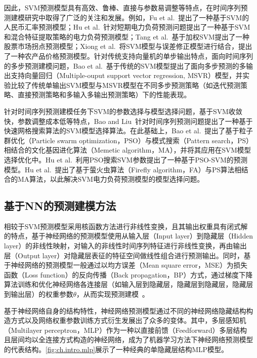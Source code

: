 因此，SVM预测模型具有高效、鲁棒、直接与参数易调整等特点，在时间序列预测建模研究中取得了广泛的关注和发展。例如，Fu et al.~\cite{fuEvolutionary2019}提出了一种基于SVM的人民币汇率预测模型；Hu et al.~\cite{huHybrid2015}针对短期电力负荷预测问题提出了一种基于SVM和混合特征提取策略的电力负荷预测模型；Tang et al.~\cite{tangNew2019}基于加权SVM提出了一种股票市场拐点预测模型；Xiong et al.~\cite{xiongCombination2015}将SVM模型与误差修正模型进行结合，提出了一种农产品价格预测模型。针对传统支持向量机的单步输出特点，面向时间序列的多步预测建模问题，Bao et al.~\cite{baoMultistepahead2014}基于传统的SVM模型提出了面向多步预测的多输出支持向量回归（Multiple-ouput support vector regression, MSVR）模型，并实验比较了传统单输出SVM模型与MSVR模型在不同多步预测策略（如迭代预测策略、直接预测策略和多输入多输出预测策略）下的性能表现。

针对时间序列预测建模任务下SVM的参数选择与模型选择问题，基于SVM收敛快，参数调整成本低等特点，Bao and Liu~\cite{baoFast2006}针对时间序列预测问题提出了一种基于快速网格搜索算法的SVM模型选择算法。在此基础上，Bao et al.~\cite{baoPSO2013}提出了基于粒子群优化（Particle swarm optimization，PSO）与模式搜索（Pattern search，PS）相结合的文化基因进化算法（Memetic algorithm，MA），并将其应用在SVM模型选择优化中。Hu et al.~\cite{huShortterm2016}利用PSO搜索SVM参数提出了一种基于PSO-SVM的预测模型。Hu et al.~\cite{huElectricity2013}提出了基于萤火虫算法（Firefly algorithm，FA）与PS算法相结合的MA算法，以此解决SVM电力负荷预测模型的模型选择问题。


\subsection{基于NN的预测建模方法\label{sec:ch.intro.nn}}
相较于SVM预测模型采用核函数方法进行非线性变换，且其输出权重具有闭式解的特点，基于神经网络的预测模型使用从输入层（Input layer）到隐藏层（Hidden layer）的非线性映射，对输入的非线性时间序列特征进行非线性变换，再由输出层（Output layer）对隐藏层表征的特征空间做线性组合进行预测输出。同时，基于神经网络的预测模型一般通过以均方误差（Mean square error，MSE）为损失函数（Loss function）的反向传播（Back propagation，BP）方式，通过梯度下降算法训练和优化神经网络各连接层（如输入层到隐藏层，隐藏层到隐藏层，隐藏层到输出层）的权重参数\(\theta\)，从而实现预测建模~\cite{zhangSimulation2001}。

基于神经网络自身的结构特性，神经网络预测模型通过不同的神经网络隐藏结构构造方式以及网络权重参数训练方式衍生发展出了众多的变体。其中，多层感知机（Multilayer perceptron，MLP）作为一种以直接前馈（Feedforward）多层结构且层间均以全连接方式构造的神经网络，成为了机器学习方法下神经网络预测模型的代表结构。\autoref{fig:ch.intro.mlp}展示了一种经典的单隐藏层结构MLP模型。

